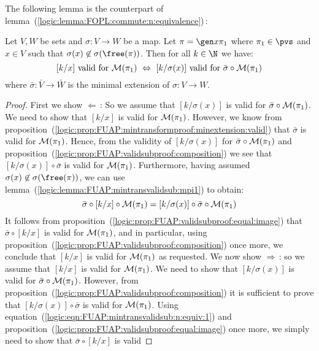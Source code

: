 The following lemma is the counterpart of
lemma~(\ref{logic:lemma:FOPL:commute:n:equivalence})\,:

\begin{lemma}\label{logic:lemma:FUAP:mintransvalidsub:n:equivalence}
Let $V,W$ be sets and $\sigma:V\to W$ be a map. Let $\pi=\gen
x\pi_{1}$ where $\pi_{1}\in\pvs$ and $x\in V$ such that
$\sigma(x)\not\in\sigma(\free(\pi))$. Then for all $k\in\N$ we have:
    \[
    \mbox{$[k/x]$ valid for ${\cal M}(\pi_{1})$}\ \Leftrightarrow
    \ \mbox{$[k/\sigma(x)]$ valid for $\bar{\sigma}\circ{\cal M}(\pi_{1})$}
    \]
where $\bar{\sigma}:\bar{V}\to\bar{W}$ is the minimal extension of
$\sigma: V\to W$.
\end{lemma}
\begin{proof}
First we show $\Leftarrow$\,: So we assume that $[k/\sigma(x)]$ is
valid for $\bar{\sigma}\circ{\cal M}(\pi_{1})$. We need to show that
$[k/x]$ is valid for ${\cal M}(\pi_{1})$. However, we know from
proposition~(\ref{logic:prop:FUAP:mintransformproof:minextension:valid})
that $\bar{\sigma}$ is valid for ${\cal M}(\pi_{1})$. Hence, from
the validity of $[k/\sigma(x)]$ for $\bar{\sigma}\circ{\cal
M}(\pi_{1})$ and
proposition~(\ref{logic:prop:FUAP:validsubproof:composition}) we see
that $[k/\sigma(x)]\circ\bar{\sigma}$ is valid for ${\cal
M}(\pi_{1})$. Furthermore, having assumed
$\sigma(x)\not\in\sigma(\free(\pi))$, we can use
lemma~(\ref{logic:lemma:FUAP:mintransvalidsub:mpi1}) to obtain:
    \begin{equation}\label{logic:eqn:FUAP:mintransvalidsub:n:equiv:1}
    \bar{\sigma}\circ [k/x]\circ{\cal
    M}(\pi_{1})= [k/\sigma(x)]\circ\bar{\sigma}\circ{\cal M}(\pi_{1})
    \end{equation}
It follows from
proposition~(\ref{logic:prop:FUAP:validsubproof:equal:image}) that
$\bar{\sigma}\circ[k/x]$ is valid for ${\cal M}(\pi_{1})$, and in
particular, using
proposition~(\ref{logic:prop:FUAP:validsubproof:composition}) once
more, we conclude that $[k/x]$ is valid for ${\cal M}(\pi_{1})$ as
requested. We now show $\Rightarrow$\,: so we assume that $[k/x]$ is
valid for ${\cal M}(\pi_{1})$. We need to show that $[k/\sigma(x)]$
is valid for $\bar{\sigma}\circ{\cal M}(\pi_{1})$. However, from
proposition~(\ref{logic:prop:FUAP:validsubproof:composition}) it is
sufficient to prove that $[k/\sigma(x)]\circ\bar{\sigma}$ is valid
for ${\cal M}(\pi_{1})$. Using
equation~(\ref{logic:eqn:FUAP:mintransvalidsub:n:equiv:1}) and
proposition~(\ref{logic:prop:FUAP:validsubproof:equal:image}) once
more, we simply need to show that $\bar{\sigma}\circ[k/x]$ is valid

\end{proof}

